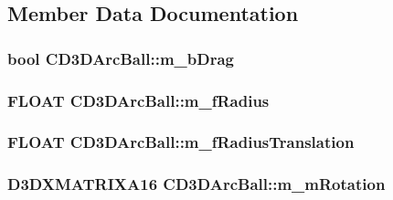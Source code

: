 \subsection{Member Data Documentation}
\hypertarget{class_c_d3_d_arc_ball_a437b55976f4fe81a6f294a2d1f11ac81}{
\subsubsection[{m\_\-bDrag}]{\setlength{\rightskip}{0pt plus 5cm}bool {\bf CD3DArcBall::m\_\-bDrag}}}
\label{class_c_d3_d_arc_ball_a437b55976f4fe81a6f294a2d1f11ac81}
\hypertarget{class_c_d3_d_arc_ball_a11401fa5425ecaab3669745a4c20e552}{
\subsubsection[{m\_\-fRadius}]{\setlength{\rightskip}{0pt plus 5cm}FLOAT {\bf CD3DArcBall::m\_\-fRadius}}}
\label{class_c_d3_d_arc_ball_a11401fa5425ecaab3669745a4c20e552}
\hypertarget{class_c_d3_d_arc_ball_a4600c8ffe537118ba7b8f7fdc60c9322}{
\subsubsection[{m\_\-fRadiusTranslation}]{\setlength{\rightskip}{0pt plus 5cm}FLOAT {\bf CD3DArcBall::m\_\-fRadiusTranslation}}}
\label{class_c_d3_d_arc_ball_a4600c8ffe537118ba7b8f7fdc60c9322}
\hypertarget{class_c_d3_d_arc_ball_a02619e72fe82db21a3c237a94eb31a37}{
\subsubsection[{m\_\-mRotation}]{\setlength{\rightskip}{0pt plus 5cm}D3DXMATRIXA16 {\bf CD3DArcBall::m\_\-mRotation}}}
